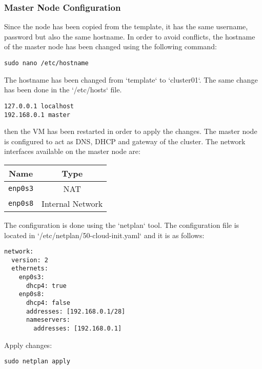\subsubsection{Master Node Configuration}

Since the node has been copied from the template, it has the same username, password but also the same hostname. In order to avoid conflicts, the hostname of the master node has been changed using the following command:

\begin{verbatim}
sudo nano /etc/hostname
\end{verbatim}

The hostname has been changed from `template` to `cluster01`. The same change has been done in the `/etc/hosts` file. 

\begin{verbatim}
127.0.0.1 localhost
192.168.0.1 master
\end{verbatim}

then the VM has been restarted in order to apply the changes.
The master node is configured to act as DNS, DHCP and gateway of the cluster. The network interfaces available on the master node are:

\begin{table}[H]
    \centering
    \begin{tabular}{|c|c|}
        \hline
        \textbf{Name} & \textbf{Type} \\
        \hline
        \texttt{enp0s3} & NAT \\
        \texttt{enp0s8} & Internal Network \\
        \hline
    \end{tabular}
\end{table}


The configuration is done using the `netplan` tool. The configuration file is located in `/etc/netplan/50-cloud-init.yaml` and it is as follows:

\begin{verbatim}
network:
  version: 2
  ethernets:
    enp0s3:
      dhcp4: true
    enp0s8:
      dhcp4: false
      addresses: [192.168.0.1/28]
      nameservers:
        addresses: [192.168.0.1]
\end{verbatim}

Apply changes:

\begin{verbatim}
sudo netplan apply
\end{verbatim}

